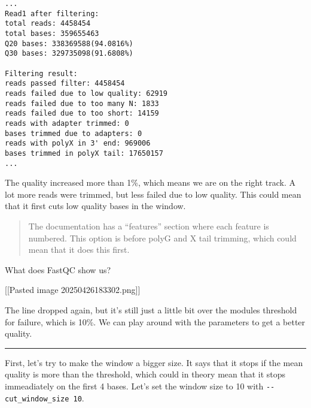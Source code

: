 \begin{verbatim}
...
Read1 after filtering:
total reads: 4458454
total bases: 359655463
Q20 bases: 338369588(94.0816%)
Q30 bases: 329735098(91.6808%)

Filtering result:
reads passed filter: 4458454
reads failed due to low quality: 62919
reads failed due to too many N: 1833
reads failed due to too short: 14159
reads with adapter trimmed: 0
bases trimmed due to adapters: 0
reads with polyX in 3' end: 969006
bases trimmed in polyX tail: 17650157
...
\end{verbatim}

The quality increased more than 1\%, which means we are on the right
track. A lot more reads were trimmed, but less failed due to low
quality. This could mean that it first cuts low quality bases in the
window.

\begin{quote}
The documentation has a ``features'' section where each feature is
numbered. This option is before polyG and X tail trimming, which could
mean that it does this first.
\end{quote}

What does FastQC show us?

{[}{[}Pasted image 20250426183302.png{]}{]}

The line dropped again, but it's still just a little bit over the
modules threshold for failure, which is 10\%. We can play around with
the parameters to get a better quality.

\begin{center}\rule{0.5\linewidth}{0.5pt}\end{center}

First, let's try to make the window a bigger size. It says that it stops
if the mean quality is more than the threshold, which could in theory
mean that it stops immeadiately on the first 4 bases. Let's set the
window size to 10 with \texttt{-\/-cut\_window\_size\ 10}.

\begin{Shaded}
\begin{Highlighting}[]
\end{Highlighting}
\end{Shaded}

